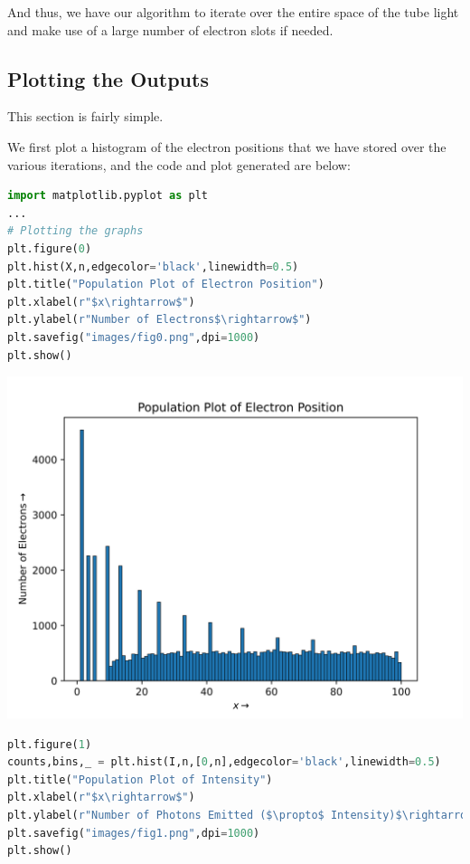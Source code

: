 \documentclass[12pt]{article}
\begin{document}
And thus, we have our algorithm to iterate over the entire space of the tube light and make use of a large number of electron slots if needed.
\pagebreak
\subsection{Plotting the Outputs}
This section is fairly simple.

We first plot a histogram of the electron positions that we have stored over the various iterations, and the code and plot generated are below:

\begin{lstlisting}[language=Python]
import matplotlib.pyplot as plt
...
# Plotting the graphs
plt.figure(0)
plt.hist(X,n,edgecolor='black',linewidth=0.5)
plt.title("Population Plot of Electron Position")
plt.xlabel(r"$x\rightarrow$")
plt.ylabel(r"Number of Electrons$\rightarrow$")
plt.savefig("images/fig0.png",dpi=1000)
plt.show()
\end{lstlisting}

\begin{center}
    \includegraphics{images/fig0.png}
\end{center}

\pagebreak
\begin{lstlisting}[language=Python]
plt.figure(1)
counts,bins,_ = plt.hist(I,n,[0,n],edgecolor='black',linewidth=0.5)
plt.title("Population Plot of Intensity")
plt.xlabel(r"$x\rightarrow$")
plt.ylabel(r"Number of Photons Emitted ($\propto$ Intensity)$\rightarrow$")
plt.savefig("images/fig1.png",dpi=1000)
plt.show()
\end{lstlisting}
\end{document}
